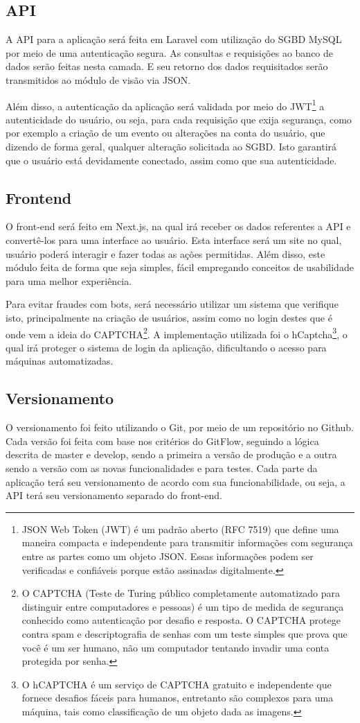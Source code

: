 \subsection{API}
A API para a aplicação será feita em Laravel com utilização do SGBD MySQL por meio de uma autenticação segura. As consultas e requisições ao banco de dados serão feitas nesta camada. E seu retorno dos dados requisitados serão transmitidos ao módulo de visão via JSON.

Além disso, a autenticação da aplicação será validada por meio do JWT\footnote{JSON Web Token (JWT) é um padrão aberto (RFC 7519) que define uma maneira compacta e independente para transmitir informações com segurança entre as partes como um objeto JSON. Essas informações podem ser verificadas e confiáveis porque estão assinadas digitalmente.} a autenticidade do usuário, ou seja, para cada requisição que exija segurança, como por exemplo a criação de um evento ou alterações na conta do usuário, que dizendo de forma geral, qualquer alteração solicitada ao SGBD. Isto garantirá que o usuário está devidamente conectado, assim como que sua autenticidade.

\subsection{Frontend}
O front-end será feito em Next.js, na qual irá receber os dados referentes a API e convertê-los para uma interface ao usuário. Esta interface será um site no qual, usuário poderá interagir e fazer todas as ações permitidas. Além disso, este módulo feita de forma que seja simples, fácil empregando conceitos de usabilidade para uma melhor experiência.

Para evitar fraudes com bots, será necessário utilizar um sistema que verifique isto, principalmente na criação de usuários, assim como no login destes que é onde vem a ideia do CAPTCHA\footnote{O CAPTCHA (Teste de Turing público completamente automatizado para distinguir entre computadores e pessoas) é um tipo de medida de segurança conhecido como autenticação por desafio e resposta. O CAPTCHA protege contra spam e descriptografia de senhas com um teste simples que prova que você é um ser humano, não um computador tentando invadir uma conta protegida por senha.}. A implementação utilizada foi o hCaptcha\footnote{O hCAPTCHA é um serviço de CAPTCHA gratuito e independente que fornece desafios fáceis para humanos, entretanto são complexos para uma máquina, tais como classificação de um objeto dada as imagens.}, o qual irá proteger o sistema de login da aplicação, dificultando o acesso para máquinas automatizadas.

\subsection{Versionamento}
O versionamento foi feito utilizando o Git, por meio de um repositório no Github. Cada versão foi feita com base nos critérios do GitFlow, seguindo a lógica descrita de master e develop, sendo a primeira a versão de produção e a outra sendo a versão com as novas funcionalidades e para testes. Cada parte da aplicação terá seu versionamento de acordo com sua funcionabilidade, ou seja, a API terá seu versionamento separado do front-end.